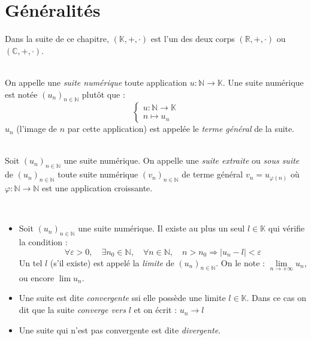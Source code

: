 \section{Généralités}
    Dans la suite de ce chapitre, \((\mathbb{K}, +, \cdot)\) est l'un des deux corps \((\mathbb{R}, +, \cdot)\) ou \((\mathbb{C}, +, \cdot)\).
    
    \begin{definition}
        \ \\
        On appelle une \emph{suite numérique} toute application \(u:\mathbb{N} \rightarrow \mathbb{K}\).
        Une suite numérique est notée \((u_n)_{n \in \mathbb{N}}\) plutôt que :
        \[
            \left\{
                \begin{array}{l}
                    u: \mathbb{N} \rightarrow \mathbb{K}\\
                    n \mapsto u_n
                \end{array}
            \right.    
        \]
        \(u_n\) (l'image de \(n\) par cette application) est appelée le \emph{terme général} de la suite.
    \end{definition}

    \begin{definition}
        \ \\
        Soit \((u_n)_{n\in\mathbb{N}}\) une suite numérique. On appelle une \emph{suite extraite} ou \emph{sous suite} de \((u_n)_{n\in\mathbb{N}}\) toute suite numérique \((v_n)_{n\in\mathbb{N}}\) de terme général \(v_n = u_{\varphi(n)}\) où \(\varphi: \mathbb{N} \rightarrow \mathbb{N}\) est une application croissante.
    \end{definition}
    
    \begin{thedef}
        \ \\
        \label{definition:limite_suite}
        \begin{itemize}
            \item Soit \((u_n)_{n\in\mathbb{N}}\) une suite numérique. Il existe au plus un seul \(l\in\mathbb{K}\) qui vérifie la condition :
            \[
                \forall \varepsilon > 0, \quad \exists n_0 \in \mathbb{N}, \quad \forall n \in \mathbb{N}, \quad n > n_0 \Rightarrow |u_n - l| < \varepsilon    
            \]
            Un tel \(l\) (s'il existe) est appelé la \emph{limite} de \((u_n)_{n\in\mathbb{N}}\). On le note :  \(\lim\limits_{n\to+\infty}u_n\), ou encore \(\lim u_n\).
            \item Une suite est dite \emph{convergente} ssi elle possède une limite \(l \in\mathbb{K}\). Dans ce cas on dit que la suite \emph{converge vers} \(l\) et on écrit : \(u_n \to l\)
            \item Une suite qui n'est pas convergente est dite \emph{divergente}.
        \end{itemize}
    \end{thedef}

